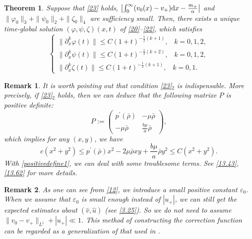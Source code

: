 \documentclass[11pt]{article}
\theoremstyle{plain}
\newtheorem{theorem}{Theorem}[section]
\newtheorem{remark}{Remark}[section]
\numberwithin{equation}{section}
\begin{document}
	\begin{theorem}\label{thm1}
	Suppose that \eqref{23} holds, $\left|\int_{0}^{\infty} (v_0(x) - v_+){\rm d}x - \frac{m_+}{\alpha}\right|$ and $\|\varphi_{0}\|_{3}+\|\psi_{0}\|_{2}+\|\zeta_{0}\|_{4}$ are sufficiency small.
		 Then, there exists a unique time-global solution $(\varphi,\psi,\zeta)(x,t)$ of \eqref{20}--\eqref{22}, which satisfies
		\begin{equation}\label{24}
			\left\{
			\begin{array}{lr}
				\|\partial_x^k\varphi(t)\|\leq C (1+t)^{-\frac{1}{2}(k+1)},\;\;\;k=0,1,2,\\[2mm]
				\|\partial_x^k\psi(t)\|\leq C (1+t)^{-\frac{1}{2}(k+2)},\;\;\;k=0,1,2,\\[2mm]
				\|\partial_x^k\zeta(t)\|\leq C (1+t)^{-\frac{1}{2}(k+1)},\;\;\;k=0,1.
			\end{array}
			\right.
		\end{equation}
	\end{theorem}
	\begin{remark}\label{remark32}
	It is worth pointing out that condition \eqref{23}$_2$ is indispensable. More precisely, if \eqref{23}$_2$ holds, then we can deduce that the following matrixe $P$ is positive definite:
		\[	
		P:=\left(\begin{array}{lr}
			p^{\prime}(\bar\rho) &-\mu\bar\rho \\
			-\mu\bar\rho & \frac{b\mu}{a}\bar\rho
		\end{array}\right),
		\]
		which implies for any $(x,y)$, we have
		\begin{equation}\label{positivedefine1}
			c\left(x^2+y^2\right)\leq p^{\prime}(\bar\rho)x^2-2\mu\bar\rho xy+\frac{b\mu}{a}\bar\rho y^2\leq C\left(x^2+y^2\right).
		\end{equation}
		With \eqref{positivedefine1}, we can deal with some troublesome terms. See \eqref{13.43}, \eqref{13.62} for more details.
	\end{remark}
	\begin{remark}\label{R1}
As one can see from \eqref{12}, we introduce a small positive constant $\varepsilon_0$. When we assume that $\varepsilon_0$ is small enough instead of $|u_+|$, we can still get the expected estimates about $(\hat{v},\hat{u})$ (see \eqref{3.25}). So we do not need to assume $\|v_{0}-v_{+}\|_{L^{1}}+|u_{+}|\ll 1$. This method of constructing the correction function can be regarded as a generalization of that used in \cite{Hsiao-Liu1992, Nishihara-Yang1999}.
\end{remark}
\end{document}
